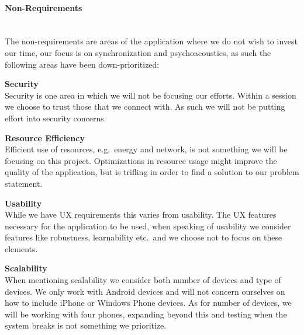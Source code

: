 \paragraph{Non-Requirements} \hfill\\
The non-requirements are areas of the application where we do not wish to invest our time, our focus is on synchronization and psychoacoustics, as such the following areas have been down-prioritized:
\begin{eromanrate}
    \item \textbf{Security} \hfill\\
    Security is one area in which we will not be focusing our efforts.
    Within a session we choose to trust those that we connect with.
    As such we will not be putting effort into security concerns.
    \item \textbf{Resource Efficiency} \hfill\\
    Efficient use of resources, e.g.~energy and network, is not something we will be focusing on this project.
    Optimizations in resource usage might improve the quality of the application, but is trifling in order to find a solution to our problem statement.
    \item \textbf{Usability} \hfill\\
    While we have \ac{UX} requirements this varies from usability.
    The \ac{UX} features necessary for the application to be used, when speaking of usability we consider features like robustness, learnability etc.~and we choose not to focus on these elements.
    \item \textbf{Scalability} \hfill\\
    When mentioning scalability we consider both number of devices and type of devices.
    We only work with Android devices and will not concern ourselves on how to include iPhone or Windows Phone devices.
    As for number of devices, we will be working with four phones, expanding beyond this and testing when the system breaks is not something we prioritize.
\end{eromanrate}
